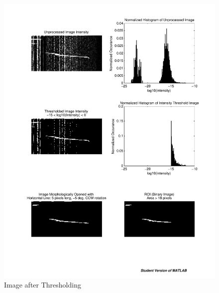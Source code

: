 \begin{figure}
	\begin{minipage}[b]{0.5\linewidth}
		\centering
		\includegraphics[trim=65 330 320 275,clip,width=1\linewidth]{gfx/SimpleThres}
		\caption{Image after Thresholding} \label{fig:bwTseg}
	\end{minipage}
	\begin{minipage}[b]{0.5\linewidth}
		\centering

\end{minipage}
\end{figure}
